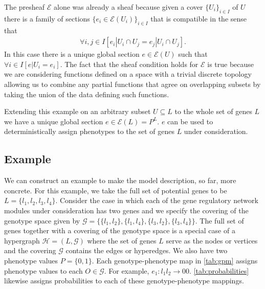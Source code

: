 The presheaf $\mathcal{E}$ alone was already a sheaf because given a cover $\{U_i\}_{i \in I}$ of $U$ there is a family of sections $\{e_i \in \mathcal{E}(U_i)\}_{i \in I}$ that is compatible in the sense that
\begin{eqnarray}
\forall i,j \in I \left[ e_i|U_i \cap U_j = e_j|U_i \cap U_j \right].
\end{eqnarray}
In this case there is a unique global section $e \in \mathcal{E}(U)$ such that $\forall i \in I \left[ e|U_i = e_i \right]$. The fact that the sheaf condition holds for $\mathcal{E}$ is true because we are considering functions defined on a space with a trivial discrete topology allowing us to combine any partial functions that agree on overlapping subsets by taking the union of the data defining such functions.

Extending this example on an arbitrary subset $U \subseteq L$ to the whole set of genes $L$ we have a unique global section $e \in \mathcal{E}(L) = P^L$. $e$ can be used to deterministically assign phenotypes to the set of genes $L$ under consideration.

\subsection{Example}
We can construct an example to make the model description, so far, more concrete. For this example, we take the full set of potential genes to be $L = \{ l_1,l_2,l_3,l_4 \}$. Consider the case in which each of the gene regulatory network modules under consideration has two genes and we specify the covering of the genotype space given by $\mathcal{G} = \{\{l_1,l_2 \},\{l_1,l_4 \},\{l_3,l_2\},\{l_3,l_4\} \}$. The full set of genes together with a covering of the genotype space is a special case of a hypergraph $\mathcal{H} = (L,\mathcal{G})$ where the set of genes $L$ serve as the nodes or vertices and the covering $\mathcal{G}$ contains the edges or hyperedges. We also have two phenotype values $P = \{0, 1\}$. Each genotype-phenotype map in \ref{tab:gpm} assigns phenotype values to each $O \in \mathcal{G}$. For example, $e_1 \colon   l_1 l_2 \rightarrow 00$. \ref{tab:probabilities} likewise assigns probabilities to each of these genotype-phenotype mappings.

